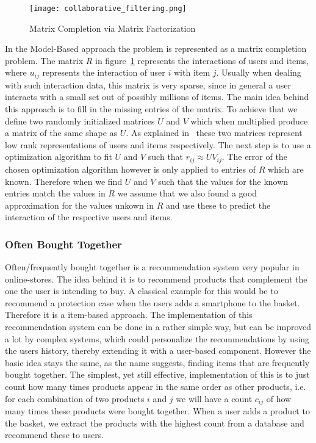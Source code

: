 \begin{figure}[ht]
	\centering
	\captionsetup{width=0.8\textwidth}
    \texttt{[image: collaborative\_filtering.png]}
    \caption{Matrix Completion via Matrix Factorization}
    \label{fig:collaborative_filtering}
\end{figure}
In the Model-Based approach the problem is represented as a matrix completion problem.
The matrix $R$ in figure~\ref{fig:collaborative_filtering} represents the interactions of users and items, where $u_{ij}$ represents the interaction of user $i$ with item $j$.
Usually when dealing with such interaction data, this matrix is very sparse, since in general a user interacts with a small set out of possibly millions of items.
The main idea behind this approach is to fill in the missing entries of the matrix.
To achieve that we define two randomly initialized matrices $U$ and $V$ which when multiplied produce a matrix of the same shape as $U$.
As explained in~\cite{collaborative_filtering} these two matrices represent low rank representations of users and items respectively.
The next step is to use a optimization algorithm to fit $U$ and $V$ such that $r_{ij} \approx UV_{ij}$.
The error of the chosen optimization algorithm however is only applied to entries of $R$ which are known.
Therefore when we find $U$ and $V$ such that the values for the known entries match the values in $R$ we assume that we also found a good approximation for the values unkown in $R$ and use these to predict the interaction of the respective users and items.

\subsubsection{Often Bought Together}
Often/frequently bought together is a recommendation system very popular in online-stores.
The idea behind it is to recommend products that complement the one the user is intending to buy.
A classical example for this would be to recommend a protection case when the users adds a smartphone to the basket.
Therefore it is a item-based approach.
The implementation of this recommendation system can be done in a rather simple way, but can be improved a lot by complex systems, which could personalize the recommendations by using the users history, thereby extending it with a user-based component.
However the basic idea stays the same, as the name suggests, finding items that are frequently bought together.
The simplest, yet still effective, implementation of this is to just count how many times products appear in the same order as other products, i.e. for each combination of two products $i$ and $j$ we will have a count $c_{ij}$ of how many times these products were bought together.
When a user adds a product to the basket, we extract the products with the highest count from a database and recommend these to users.

